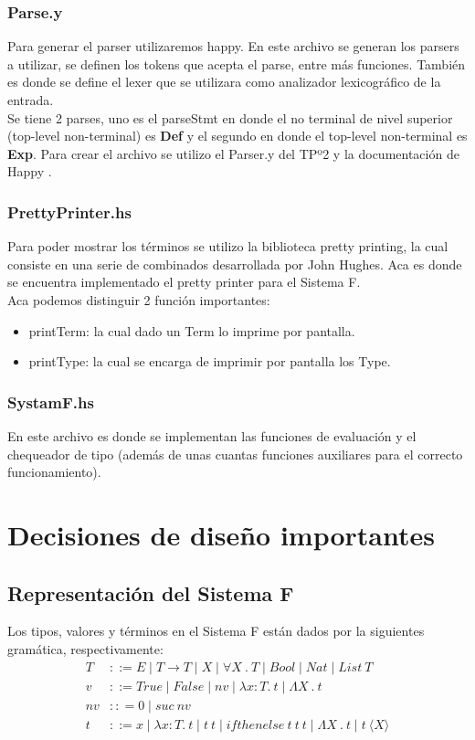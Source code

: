 \documentclass[12pt, titlepage, a4paper]{article}
\begin{document}
\subsubsection{Parse.y}
Para generar el parser utilizaremos happy. En este archivo se generan los parsers a utilizar, se definen los tokens que acepta el parse, 
entre más funciones. También es donde se define el lexer que se utilizara como analizador lexicográfico de la entrada. \\ 

Se tiene 2 parses, uno es el parseStmt en donde el no terminal de nivel superior (top-level non-terminal) es \textbf{Def} y el 
segundo en donde el top-level non-terminal es \textbf{Exp}. 
Para crear el archivo se utilizo el Parser.y del TPº2 \cite{tp2:lambdaCalculoSimpleTipado} y la documentación de Happy \cite{haskellHappy}. \\

\subsubsection{PrettyPrinter.hs}
Para poder mostrar los términos se utilizo la biblioteca pretty printing, la cual consiste en una serie de combinados desarrollada por John Hughes. Aca es 
donde se encuentra implementado el pretty printer para el Sistema F. \\
Aca podemos distinguir 2 función importantes:
\begin{itemize}[label=$\bullet$]
  \item {printTerm: la cual dado un Term lo imprime por pantalla.}
  \item {printType: la cual se encarga de imprimir por pantalla los Type.}
\end{itemize}

\subsubsection{SystamF.hs}
En este archivo es donde se implementan las funciones de evaluación y el chequeador de tipo (además de unas cuantas funciones auxiliares 
para el correcto funcionamiento).

\section{Decisiones de diseño importantes}
\subsection{Representación del Sistema F}
Los tipos, valores y términos en el Sistema F están dados por la siguientes gramática, respectivamente:
\begin{align*}
    T &::= E \mid T \rightarrow T \mid X \mid \forall X \ . \ T \mid Bool \mid Nat \mid List \ T\\
    v &::= True \mid False \mid nv \mid \lambda x:T. \ t \mid \Lambda X \ . \ t \\
    nv &:: = 0 \mid suc \ nv \\
    t &::= x \mid \lambda x:T. \ t \mid t \ t \mid ifthenelse \ t \ t \ t \mid \Lambda X \ . \ t \mid t \ \langle X \rangle \\
\end{align*}
\end{document}
